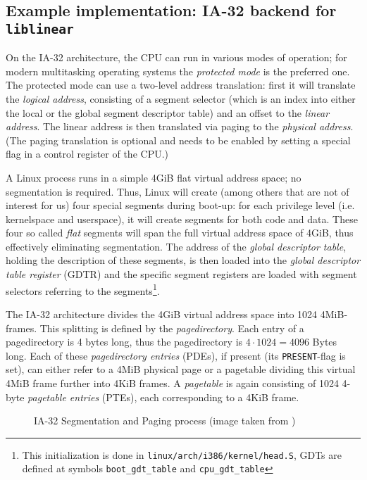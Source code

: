 \subsection{Example implementation: IA-32 backend for \texttt{liblinear}}

On the IA-32 architecture, the CPU can run in various modes of operation; for
modern multitasking operating systems the \emph{protected mode} is the preferred
one.  The protected mode can use a two-level address translation: first it will
translate the \emph {logical address}, consisting of a segment selector (which
is an index into either the local or the global segment descriptor table) and an
offset to the \emph{linear address}.  The linear address is then translated via
paging to the \emph{physical address}. (The paging translation is optional and
needs to be enabled by setting a special flag in a control register of the CPU.)

\label{linux_gdt} A Linux process runs in a simple 4GiB flat virtual address
space; no segmentation is required. Thus, Linux will create (among others that
are not of interest for us) four special segments during boot-up: for each
privilege level (i.e. kernelspace and userspace), it will create segments for
both code and data. These four so called \emph{flat} segments will span the full
virtual address space of 4GiB, thus effectively eliminating segmentation. The
address of the \emph{global descriptor table}, holding the description of these
segments, is then loaded into the \emph{global descriptor table register} (GDTR)
and the specific segment registers are loaded with segment selectors referring
to the segments\footnote{This initialization is done in
\texttt{linux/arch/i386/kernel/head.S}, GDTs are defined at symbols
\texttt{boot\_gdt\_table} and \texttt{cpu\_gdt\_table}}.

The IA-32 architecture divides the 4GiB virtual address space into 1024
4MiB-frames. This splitting is defined by the \emph{pagedirectory}. Each entry
of a pagedirectory is 4 bytes long, thus the pagedirectory is $4 \cdot 1024 =
4096$ Bytes long. Each of these \emph{pagedirectory entries} (PDEs), if present
(its \texttt{PRESENT}-flag is set), can either refer to a 4MiB physical page or
a pagetable dividing this virtual 4MiB frame further into 4KiB frames. A
\emph{pagetable} is again consisting of 1024 4-byte \emph{pagetable entries}
(PTEs), each corresponding to a 4KiB frame.

\begin{figure}[ht] \begin{center}



	\caption{IA-32 Segmentation and Paging process (image taken from
	\cite{IA32_SDM_3a:2006})}

	\label{fig:ia32_segmentation_paging}

\end{center}\end{figure}

